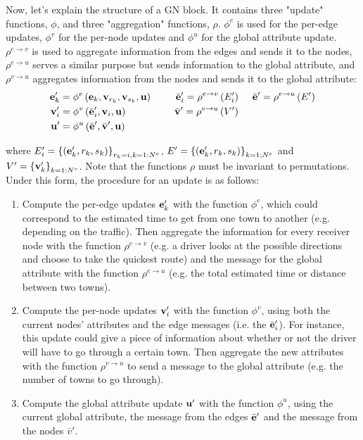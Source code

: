 \documentclass{article}
\begin{document}
Now, let's explain the structure of a GN block. It contains three "update" functions, $\phi$, and three "aggregation" functions, $\rho$. $\phi^e$ is used for the per-edge updates, $\phi^v$ for the per-node updates and $\phi^u$ for the global attribute update. $\rho^{e \rightarrow v}$ is used to aggregate information from the edges and sends it to the nodes, $\rho^{e \rightarrow u}$ serves a similar purpose but sends information to the global attribute, and $\rho^{v \rightarrow u}$ aggregates information from the nodes and sends it to the global attribute:
\begin{equation*}
    \begin{aligned}
    \mathbf{e}_k' &= \phi^e \left( \mathbf{e}_k, \mathbf{v}_{r_k}, \mathbf{v}_{s_k}, \mathbf{u} \right) &\hspace*{5mm} \bar{\mathbf{e}}_i' = \rho^{e \rightarrow v} \left( E_i' \right) &\hspace*{5mm} \bar{\mathbf{e}}' = \rho^{e \rightarrow u} \left( E' \right) \\
    \mathbf{v}_i' &= \phi^v \left( \bar{\mathbf{e}}_i', \mathbf{v}_i, \mathbf{u} \right) &\hspace*{5mm} \bar{\mathbf{v}}' = \rho^{v \rightarrow u} \left( V' \right) & \\
    \mathbf{u}' &= \phi^u \left( \bar{\mathbf{e}}', \bar{\mathbf{v}}', \mathbf{u} \right) & &
    \end{aligned}
\end{equation*}

where $E_i' = \left\{ \left( \mathbf{e}_k', r_k, s_k \right) \right\}_{r_k=i, k=1:N^e}$, $E' = \left\{ \left( \mathbf{e}_k', r_k, s_k \right) \right\}_{k=1;N^e}$ and $V' = \left\{ \mathbf{v}_k' \right\}_{k=1:N^v}$. Note that the functions $\rho$ must be invariant to permutations. Under this form, the procedure for an update is as follows:

\begin{enumerate}
    \item Compute the per-edge updates $\mathbf{e}_k'$ with the function $\phi^e$, which could correspond to the estimated time to get from one town to another (e.g. depending on the traffic). Then aggregate the information for every receiver node with the function $\rho^{e \rightarrow v}$ (e.g. a driver looks at the possible directions and choose to take the quickest route) and the message for the global attribute with the function $\rho^{e \rightarrow u}$ (e.g. the total estimated time or distance between two towns).
    
    \item Compute the per-node updates $\mathbf{v}_i'$ with the function $\phi^v$, using both the current nodes' attributes and the edge messages (i.e. the $\bar{\mathbf{e}}_i'$). For instance, this update could give a piece of information about whether or not the driver will have to go through a certain town. Then aggregate the new attributes with the function $\rho^{v \rightarrow u}$ to send a message to the global attribute (e.g. the number of towns to go through).
    
    \item Compute the global attribute update $\mathbf{u}'$ with the function $\phi^u$, using the current global attribute, the message from the edges $\bar{\mathbf{e}}'$ and the message from the nodes $\bar{v}'$.
\end{enumerate}
\end{document}
